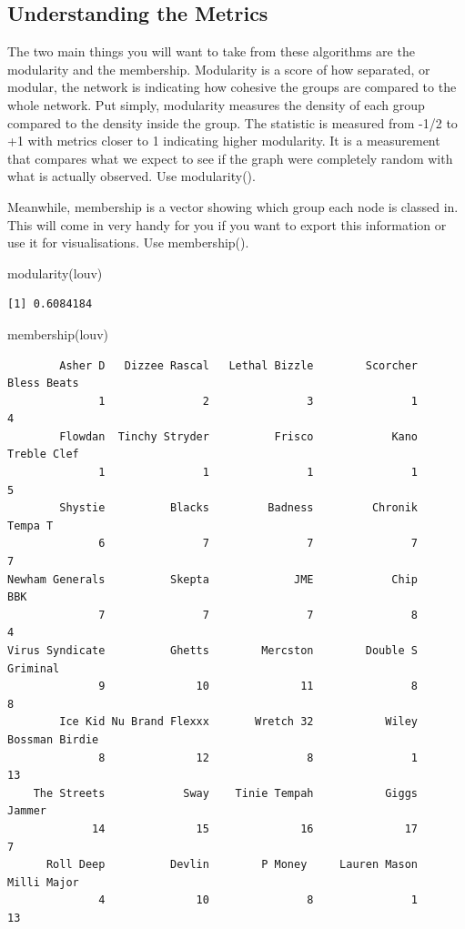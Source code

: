 \documentclass[
  letterpaper,
  DIV=11,
  numbers=noendperiod]{scrreprt}
\newenvironment{Shaded}{\begin{snugshade}}{\end{snugshade}}
\newcommand{\FunctionTok}[1]{\textcolor[rgb]{0.28,0.35,0.67}{#1}}
\newcommand{\NormalTok}[1]{\textcolor[rgb]{0.00,0.23,0.31}{#1}}
\begin{document}
\subsection{Understanding the Metrics}\label{understanding-the-metrics}

The two main things you will want to take from these algorithms are the
modularity and the membership. Modularity is a score of how separated,
or modular, the network is indicating how cohesive the groups are
compared to the whole network. Put simply, modularity measures the
density of each group compared to the density inside the group. The
statistic is measured from -1/2 to +1 with metrics closer to 1
indicating higher modularity. It is a measurement that compares what we
expect to see if the graph were completely random with what is actually
observed. Use modularity().

Meanwhile, membership is a vector showing which group each node is
classed in. This will come in very handy for you if you want to export
this information or use it for visualisations. Use membership().

\begin{Shaded}
\begin{Highlighting}[]
\FunctionTok{modularity}\NormalTok{(louv)}
\end{Highlighting}
\end{Shaded}

\begin{verbatim}
[1] 0.6084184
\end{verbatim}

\begin{Shaded}
\begin{Highlighting}[]
\FunctionTok{membership}\NormalTok{(louv)}
\end{Highlighting}
\end{Shaded}

\begin{verbatim}
        Asher D   Dizzee Rascal   Lethal Bizzle        Scorcher     Bless Beats 
              1               2               3               1               4 
        Flowdan  Tinchy Stryder          Frisco            Kano     Treble Clef 
              1               1               1               1               5 
        Shystie          Blacks         Badness         Chronik         Tempa T 
              6               7               7               7               7 
Newham Generals          Skepta             JME            Chip             BBK 
              7               7               7               8               4 
Virus Syndicate          Ghetts        Mercston        Double S        Griminal 
              9              10              11               8               8 
        Ice Kid Nu Brand Flexxx       Wretch 32           Wiley  Bossman Birdie 
              8              12               8               1              13 
    The Streets            Sway    Tinie Tempah           Giggs          Jammer 
             14              15              16              17               7 
      Roll Deep          Devlin        P Money     Lauren Mason     Milli Major 
              4              10               8               1              13 
\end{verbatim}
\end{document}
